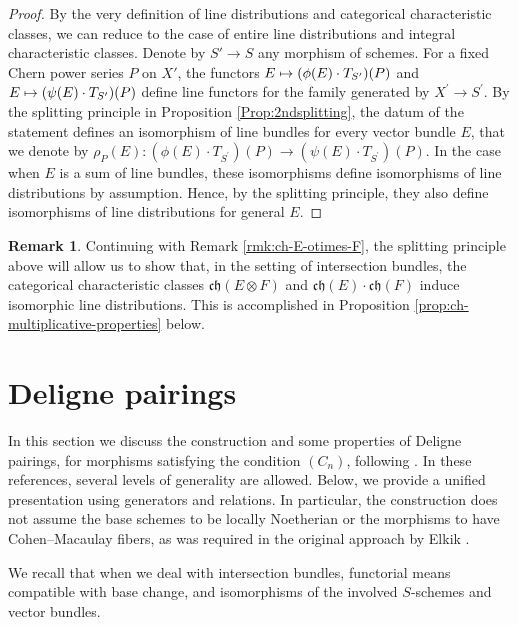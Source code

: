 \documentclass[JEP,XML,SOM,Unicode,published]{cedram}
\newcommand\mto{\mathchoice{\longmapsto}{\mapsto}{\mapsto}{\mapsto}}
\theoremstyle{plain}
\theoremstyle{definition}
\newtheorem{remark}[theorem]{Remark}
\newcommand{\chfrak}{\mathfrak {ch}}
\begin{document}
\begin{proof}
By the very definition of line distributions and categorical characteristic classes, we can reduce to the case of entire line distributions and integral characteristic classes. Denote by $S'\to S$ any morphism of schemes. For a fixed Chern power series $P$ on $X'$, the functors $E \mto (\phi(E) \cdot T_{S^{\prime}})(P)$ and $E \mto (\psi(E) \cdot T_{S'})(P)$ define line functors for the family generated by $X^{\prime}\to S^{\prime}$. By the splitting principle in Proposition \ref{Prop:2ndsplitting}, the datum of the statement defines an isomorphism of line bundles for every vector bundle $E$, that we denote by $\rho_P(E): (\phi(E) \cdot T_{S^{\prime}})(P) \to (\psi(E) \cdot T_{S^{\prime}})(P)$. In the case when $E$ is a sum of line bundles, these isomorphisms define isomorphisms of line distributions by assumption. Hence, by the splitting principle, they also define isomorphisms of line distributions for general $E$.
\end{proof}

\begin{remark}\label{rmk:ch-E-otimes-F-2}
Continuing with Remark \ref{rmk:ch-E-otimes-F}, the splitting principle above will allow us to show that, in the setting of intersection bundles, the categorical characteristic classes $\chfrak(E\otimes F)$ and $\chfrak(E)\cdot\chfrak(F)$ induce isomorphic line distributions. This is accomplished in Proposition \ref{prop:ch-multiplicative-properties} below.
\end{remark}

\section{Deligne pairings}\label{section:intersection-bundles}
In this section we discuss the construction and some properties of Deligne pairings, for morphisms satisfying the condition $(C_n)$, following \cite{Boucksom-Eriksson, Deligne-determinant, Ducrot, Elkikfib, Eriksson-Freixas-Wentworth, Munoz}. In these references, several levels of generality are allowed. Below, we provide a unified presentation using generators and relations. In particular, the construction does not assume the base schemes to be locally Noetherian or the morphisms to have Cohen--Macaulay fibers, as was required in the original approach by Elkik \cite{Elkikfib}.

We recall that when we deal with intersection bundles, functorial means compatible with base change, and isomorphisms of the involved $S$-schemes and vector bundles.
\end{document}
